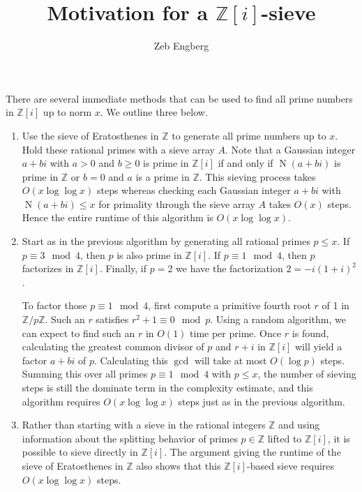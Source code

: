 \documentclass{article}
\begin{document}
\title{Motivation for a $\mathbb{Z}[i]$-sieve}
\date{}
\author{Zeb Engberg}
\maketitle


There are several immediate methods that can be used to find all prime numbers in $\mathbb{Z}[i]$ up to norm $x$. We outline three below.
\begin{enumerate}
\item Use the sieve of Eratosthenes in $\mathbb{Z}$ to generate all prime numbers up to $x$. Hold these rational primes with a sieve array $A$. Note that a Gaussian integer $a + bi$ with $a > 0$ and $b\ge 0$ is prime in $\mathbb{Z}[i]$ if and only if $\operatorname N(a + bi)$ is prime in $\mathbb{Z}$ or $b = 0$ and $a$ is a prime in $\mathbb{Z}$. This sieving process takes $O(x \log \log x)$ steps whereas checking each Gaussian integer $a + bi$ with $\operatorname N(a + bi) \le x$ for primality through the sieve array $A$ takes $O(x)$ steps. Hence the entire runtime of this algorithm is $O(x \log \log x)$.

\item Start as in the previous algorithm by generating all rational primes $p\le x$. If $p \equiv 3 \mod 4$, then $p$ is also prime in $\mathbb{Z}[i]$. If $p \equiv 1 \mod 4$, then $p$ factorizes in $\mathbb{Z}[i]$. Finally, if $p = 2$ we have the factorization $2 = - i (1 + i) ^ 2$.

To factor those $p \equiv 1 \mod 4$, first compute a primitive fourth root $r$ of 1 in $\mathbb{Z}/p\mathbb{Z}$. Such an $r$ satisfies $r ^ 2 + 1 \equiv 0 \mod p$. Using a random algorithm, we can expect to find such an $r$ in $O(1)$ time per prime. Once $r$ is found, calculating the greatest common divisor of $p$ and $r + i$ in $\mathbb{Z}[i]$ will yield a factor $a + bi$ of $p$. Calculating this $\gcd$ will take at most $O(\log p)$ steps. Summing this over all primes $p\equiv 1 \mod 4$ with $p\le x$, the number of sieving steps is still the dominate term in the complexity estimate, and this algorithm requires $O(x \log \log x)$ steps just as in the previous algorithm.

\item Rather than starting with a sieve in the rational integers $\mathbb{Z}$ and using information about the splitting behavior of primes $p\in\mathbb{Z}$ lifted to $\mathbb{Z}[i]$, it is possible to sieve directly in $\mathbb{Z}[i]$. The argument giving the runtime of the sieve of Eratosthenes in $\mathbb{Z}$ also shows that this $\mathbb{Z}[i]$-based sieve requires $O(x \log \log x)$ steps.
\end{enumerate}
\end{document}

